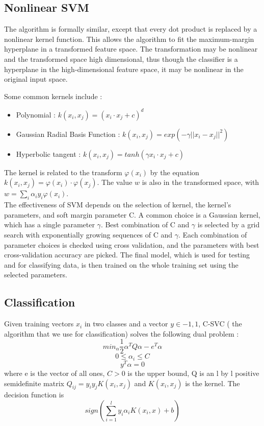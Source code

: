 \subsection{Nonlinear SVM}

The algorithm is formally similar, except that every dot product is replaced by a nonlinear kernel function. This allows the algorithm to fit the maximum-margin hyperplane in a transformed feature space.
The transformation may be nonlinear and the transformed space high dimensional, thus though the classifier is a hyperplane in the high-dimensional feature space, it may be nonlinear in the original input space.

Some common kernels include : 
\begin{itemize}
 \item Polynomial : $k(x_i,x_j)=(x_i\cdot x_j+c)^d$
 \item Gaussian Radial Basis Function : $k(x_i,x_j)=exp(-\gamma ||x_i-x_j||^2)$
 \item Hyperbolic tangent : $k(x_i,x_j)=tanh(\gamma x_i\cdot x_j + c)$
\end{itemize}
The kernel is related to the transform $\varphi(x_i)$ by the equation $k(x_i,x_j)=\varphi(x_i)\cdot\varphi(x_j)$. The value $w$ is also in the transformed space, with $w=\sum_i\alpha_i y_i\varphi(x_i)$.\\

The effectiveness of SVM depends on the selection of kernel, the kernel's parameters, and soft margin parameter C. A common choice is a Gaussian kernel, which has a single parameter $\gamma$. Best combination of
C and $\gamma$ is selected by a grid search with exponentially growing sequences of C and $\gamma$. Each combination of parameter choices is checked using cross validation, and the parameters with best cross-validation accuracy are picked. 
The final model, which is used for testing and for classifying data, is then trained on the whole training set using the selected parameters.

\subsection{Classification}

Given training vectors $x_i$ in two classes and a vector $y\in{-1,1}$, C-SVC ( the algorithm that we use for classification) solves the following dual problem :
\[min_{\alpha} \frac{1}{2} \alpha^TQ\alpha-e^T\alpha\]
\[0\leq \alpha_i \leq C\]
\[y^T\alpha=0\]
where e is the vector of all ones, $C>0$ is the upper bound, Q is an l by l positive semidefinite matrix $Q_{ij}=y_iy_jK(x_i,x_j)$ and $K(x_i,x_j)$ is the kernel. The decision function is 
\[sign(\sum_{i=1}^l y_i\alpha_iK(x_i,x)+b)\]

